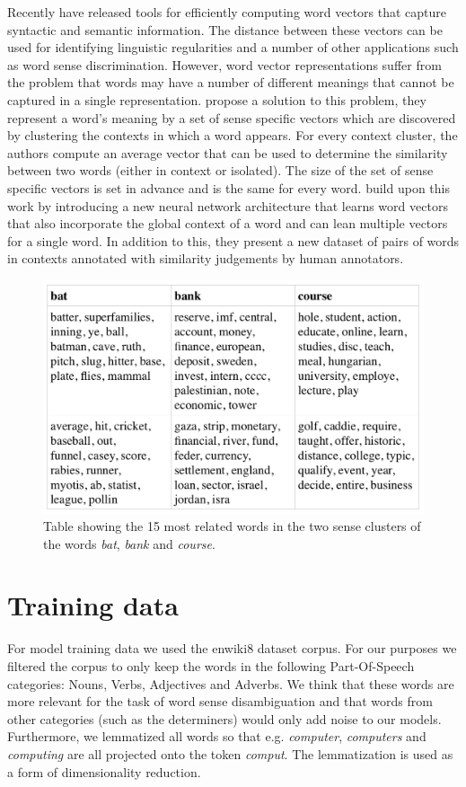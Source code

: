 \documentclass[11pt]{article}
\begin{document}
Recently \cite{word2vec} have released tools for efficiently computing word vectors that capture syntactic and semantic information. The distance between these vectors can be used for identifying linguistic regularities \cite{regularities} and a number of other applications such as word sense discrimination. However, word vector representations suffer from the problem that words may have a number of different meanings that cannot be captured in a single representation. \cite{multi} propose a solution to this problem, they represent a word's meaning by a set of sense specific vectors which are discovered by clustering the contexts in which a word appears. For every context cluster, the authors compute an average vector that can be used to determine the similarity between two words (either in context or isolated). The size of the set of sense specific vectors is set in advance and is the same for every word. \cite{global} build upon this work by introducing a new neural network architecture that learns word vectors that also incorporate the global context of a word and can lean multiple vectors for a single word. In addition to this, they present a new dataset of pairs of words in contexts annotated with similarity judgements by human annotators. 

\begin{figure}
\center
\includegraphics[scale=0.35]{images/cocores.png}
\caption{Table showing the 15 most related words in the two sense clusters of the words \textit{bat}, \textit{bank} and \textit{course}. }
\label{coconutres}
\end{figure}

\section{Training data}
For model training data we used the enwiki8 dataset \cite{enwiki} corpus. For our purposes we filtered the corpus to only keep the words in the following Part-Of-Speech categories: Nouns, Verbs, Adjectives and Adverbs. We think that these words are more relevant for the task of word sense disambiguation and that words from other categories (such as the determiners) would only add noise to our models. Furthermore, we lemmatized all words so that e.g. \textit{computer}, \textit{computers} and \textit{computing} are all projected onto the token \textit{comput}. The lemmatization is used as a form of dimensionality reduction.
\end{document}
